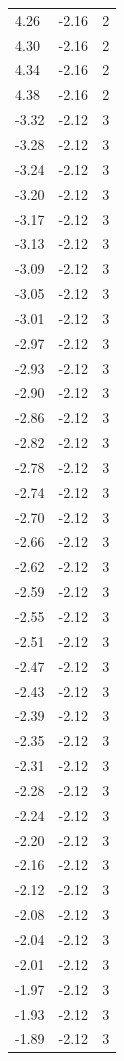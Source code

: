 \begin{longtable}{lrr}
  4.26 & -2.16 & 2 \\
  4.30 & -2.16 & 2 \\
  4.34 & -2.16 & 2 \\
  4.38 & -2.16 & 2 \\
  -3.32 & -2.12 & 3 \\
  -3.28 & -2.12 & 3 \\
  -3.24 & -2.12 & 3 \\
  -3.20 & -2.12 & 3 \\
  -3.17 & -2.12 & 3 \\
  -3.13 & -2.12 & 3 \\
  -3.09 & -2.12 & 3 \\
  -3.05 & -2.12 & 3 \\
  -3.01 & -2.12 & 3 \\
  -2.97 & -2.12 & 3 \\
  -2.93 & -2.12 & 3 \\
  -2.90 & -2.12 & 3 \\
  -2.86 & -2.12 & 3 \\
  -2.82 & -2.12 & 3 \\
  -2.78 & -2.12 & 3 \\
  -2.74 & -2.12 & 3 \\
  -2.70 & -2.12 & 3 \\
  -2.66 & -2.12 & 3 \\
  -2.62 & -2.12 & 3 \\
  -2.59 & -2.12 & 3 \\
  -2.55 & -2.12 & 3 \\
  -2.51 & -2.12 & 3 \\
  -2.47 & -2.12 & 3 \\
  -2.43 & -2.12 & 3 \\
  -2.39 & -2.12 & 3 \\
  -2.35 & -2.12 & 3 \\
  -2.31 & -2.12 & 3 \\
  -2.28 & -2.12 & 3 \\
  -2.24 & -2.12 & 3 \\
  -2.20 & -2.12 & 3 \\
  -2.16 & -2.12 & 3 \\
  -2.12 & -2.12 & 3 \\
  -2.08 & -2.12 & 3 \\
  -2.04 & -2.12 & 3 \\
  -2.01 & -2.12 & 3 \\
  -1.97 & -2.12 & 3 \\
  -1.93 & -2.12 & 3 \\
  -1.89 & -2.12 & 3 \\

\end{longtable}
